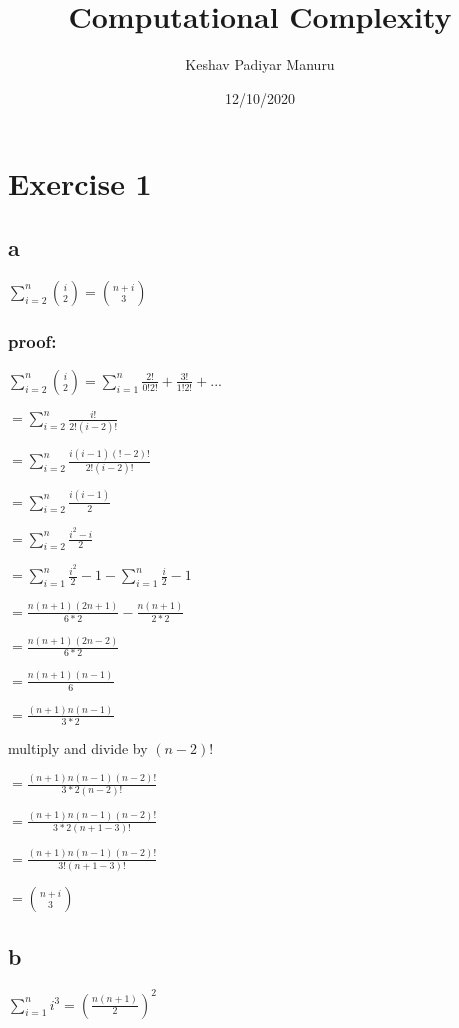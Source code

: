\documentclass[
]{article}
\title{Computational Complexity}
\author{Keshav Padiyar Manuru}
\date{12/10/2020}
\begin{document}
\maketitle

\hypertarget{exercise-1}{%
\section{Exercise 1}\label{exercise-1}}

\hypertarget{a}{%
\subsection{a}\label{a}}

\(\sum_{i=2}^n \binom{i}{2} = \binom{n+i}{3}\)

\hypertarget{proof}{%
\subsubsection{proof:}\label{proof}}

\(\sum_{i=2}^n \binom{i}{2} = \sum_{i=1}^n \frac{2!}{0! 2!} + \frac{3!}{1!2!}+ ...\)

\(= \sum_{i=2}^n \frac{i!}{2!(i-2)!}\)

\(= \sum_{i=2}^n \frac{i (i-1) (!-2)!}{2!(i-2)!}\)

\(= \sum_{i=2}^n \frac{i (i-1)}{2}\)

\(= \sum_{i=2}^n \frac{i^2-i}{2}\)

\(= \sum_{i=1}^n \frac{i^2}{2}-1-\sum_{i=1}^n \frac{i}{2}-1\)

\(=\frac{n(n+1)(2n+1)}{6 *2} - \frac{n(n+1)}{2 * 2}\)

\(=\frac{n(n+1)(2n-2)}{6*2}\)

\(=\frac{n(n+1)(n-1)}{6}\)

\(=\frac{(n+1) n (n-1)}{3*2}\)

multiply and divide by \((n-2)!\)

\(=\frac{(n+1) n (n-1) (n-2)!}{3*2 (n-2)!}\)

\(=\frac{(n+1) n (n-1) (n-2)!}{3*2 (n+1 - 3)!}\)

\(=\frac{(n+1) n (n-1) (n-2)!}{3! (n+1 - 3)!}\)

\(= \binom{n+i}{3}\)

\hypertarget{b}{%
\subsection{b}\label{b}}

\(\sum_{i=1}^n i^3 = (\frac{n(n+1)}{2})^2\)
\end{document}
